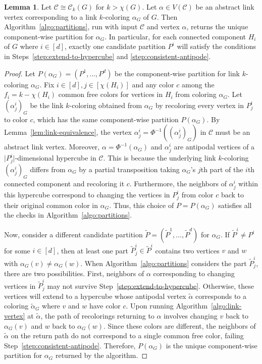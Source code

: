 \documentclass{amsart}
\theoremstyle{hypothesisstyle}
\theoremstyle{definition}
\newtheorem{lemma}[theorem]{Lemma}
\theoremstyle{remark}
\numberwithin{equation}{section}
\newcommand{\abs}[1]{\lvert#1\rvert}
\newcommand{\C}{\mathcal C}
\begin{document}
 \begin{lemma}\label{lem:extract-partition}
     Let $\C\cong\C_k(G)$ for $k>\chi(G)$. Let $\alpha\in V(\C)$ be an abstract link vertex corresponding to a link $k$-coloring $\alpha_G$ of $G$. Then Algorithm~\ref{algo:partitions}, run with input $\C$ and vertex $\alpha$, returns the unique component-wise partition for $\alpha_G$. In particular, for each connected component $H_i$ of $G$ where $i\in [d]$, exactly one candidate partition $P^i$ will satisfy the conditions in Steps~\ref{step:extend-to-hypercube} and \ref{step:consistent-antipode}.
 \end{lemma}

 \begin{proof} Let $P(\alpha_G)=(P^1,\dots, P^d)$ be the component-wise partition for link $k$-coloring $\alpha_G$.  Fix $i\in[d],j\in[\chi(H_i)]$ and any color $c$ among the $f_i=k-\chi(H_i)$ common free colors for vertices in $H_i$ from coloring $\alpha_G$. Let $(\alpha^i_j)_G$ be the link $k$-coloring obtained from $\alpha_G$ by recoloring every vertex in $P^i_j$ to color $c$, which has the same component-wise partition $P(\alpha_{G})$. By Lemma~\ref{lem:link-equivalence}, the vertex $\alpha_j^i=\Phi^{-1}((\alpha_j^i)_G)$ in $\C$ must be an abstract link vertex.  Moreover, $\alpha=\Phi^{-1}(\alpha_G)$ and $\alpha_j^i$ are antipodal vertices of a $\abs{P^i_j}$-dimensional hypercube in $\mathcal{C}$. This is because the underlying link $k$-coloring $(\alpha_j^{i})_G$ differs from $\alpha_G$ by a partial transposition taking $\alpha_G$'s $j$th part of the $i$th connected component and recoloring it $c$. Furthermore, the neighbors of $\alpha_j^i$ within this hypercube correspond to changing the vertices in $P^i_j$ from color $c$ back to their original common color in $\alpha_G$. Thus, this choice of $P=P(\alpha_G)$ satisfies all the checks in Algorithm~\ref{algo:partitions}.
 
Now, consider a different candidate partition $\tilde P = (\tilde P^1, \dots, \tilde P^d)$ for $\alpha_G$. If $\tilde P^i\neq P^i$ for some $i\in [d]$, then at least one part $\tilde P^{i}_j \in \tilde P^i$ contains two vertices $v$ and $w$ with $\alpha_G(v)\neq \alpha_G(w)$. When Algorithm~\ref{algo:partitions} considers the part $\tilde P^{i}_j$, there are two possibilities. First, neighbors of $\alpha$ corresponding to changing vertices in $\tilde P^{i}_j$ may not survive Step~\ref{step:extend-to-hypercube}. Otherwise, these vertices will extend to a hypercube whose antipodal vertex $\tilde{\alpha}$ corresponds to a coloring $\tilde{\alpha}_G$ where $v$ and $w$ have color $c$. Upon running Algorithm~\ref{algo:link-vertex} at $\tilde{\alpha}$, the path of recolorings returning to $\alpha$ involves changing $v$ back to $\alpha_G(v)$ and $w$ back to $\alpha_G(w)$. Since these colors are different, the neighbors of $\tilde{\alpha}$ on the return path do not correspond to a single common free color, failing Step~\ref{step:consistent-antipode}. Therefore, $P(\alpha_G)$ is the unique component-wise partition for $\alpha_G$ returned by the algorithm. \end{proof}
\end{document}
